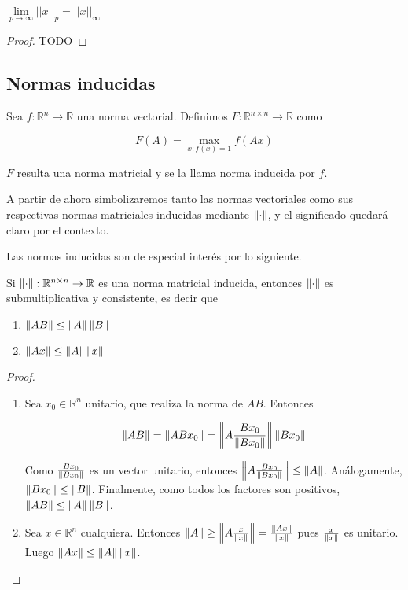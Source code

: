 \begin{propi} $\lim\limits_{p\to\infty}{||x||_p} = ||x||_{\infty}$

    \begin{proof}
        TODO
    \end{proof}
\end{propi}

\subsection{Normas inducidas}

\begin{defi}
Sea $f : \mathbb{R}^n \to \mathbb{R}$ una norma vectorial. Definimos $F : \mathbb{R}^{n \times n} \to \mathbb{R}$ como

\[
F(A) = \max\limits_{x : f(x) = 1} f(Ax)
\]

$F$ resulta una norma matricial y se la llama norma inducida por $f$.
\end{defi}

A partir de ahora simbolizaremos tanto las normas vectoriales como sus respectivas normas matriciales inducidas mediante $\left\lVert\cdot\right\rVert$, y el significado quedará claro por el contexto.

Las normas inducidas son de especial interés por lo siguiente.

\begin{propo}
Si $\left\lVert\cdot\right\rVert : \mathbb{R}^{n \times n} \to \mathbb{R}$ es una norma matricial inducida, entonces $\left\lVert\cdot\right\rVert$ es submultiplicativa y consistente, es decir que
\begin{enumerate}
\item $\left\lVert AB\right\rVert \leq \left\lVert A\right\rVert\left\lVert B\right\rVert$
\item $\left\lVert Ax\right\rVert \leq \left\lVert A\right\rVert\left\lVert x\right\rVert$
\end{enumerate}

\begin{proof}
\begin{enumerate}
\item Sea $x_0 \in \mathbb{R}^n$ unitario, que realiza la norma de $AB$. Entonces

\[\left\lVert AB\right\rVert = \left\lVert ABx_0\right\rVert = \left\lVert A\frac{Bx_0}{\left\lVert Bx_0\right\rVert}\right\rVert\left\lVert Bx_0\right\rVert\]

Como $\frac{Bx_0}{\left\lVert Bx_0\right\rVert}$ es un vector unitario, entonces $\left\lVert A\frac{Bx_0}{\left\lVert Bx_0\right\rVert}\right\rVert \leq \left\lVert A\right\rVert$. Análogamente, $\left\lVert Bx_0\right\rVert \leq \left\lVert B\right\rVert$. Finalmente, como todos los factores son positivos, $\left\lVert AB\right\rVert \leq \left\lVert A\right\rVert \left\lVert B\right\rVert$.

\item Sea $x \in \mathbb{R}^n$ cualquiera. Entonces $\left\lVert A\right\rVert \geq \left\lVert A \frac{x}{\left\lVert x\right\rVert}\right\rVert = \frac{\left\lVert Ax\right\rVert}{\left\lVert x\right\rVert}$ pues $\frac{x}{\left\lVert x\right\rVert}$ es unitario. Luego $\left\lVert Ax\right\rVert \leq \left\lVert A\right\rVert\left\lVert x\right\rVert$.
\end{enumerate}
\end{proof}
\end{propo}

